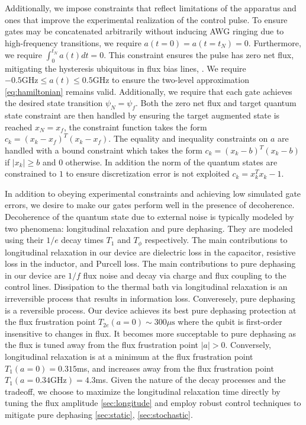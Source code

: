 Additionally, we impose constraints that reflect limitations
of the apparatus and ones that improve the experimental realization
of the control pulse. To ensure gates may be concatenated arbitrarily without
inducing AWG ringing due to high-frequency transitions,
we require $a(t = 0) = a(t = t_{N}) = 0$.
Furthermore, we require $\int_{0}^{t_{N}} a(t) dt = 0$. This
constraint ensures the pulse has zero net flux, mitigating
the hysteresis ubiquitous in flux bias lines,
\cite{battistel2019fast, krantz2019quantum, zhang2020universal}.
We require $-0.5 \textrm{GHz} \le a(t) \le 0.5 \textrm{GHz}$
to ensure the two-level approximation \eqref{eq:hamiltonian}
remains valid. Additionally, we require that each gate achieves
the desired state transition $\psi_{N} = \psi_{f}$.
Both the zero net flux and target quantum state constraint
are then handled by ensuring the target augmented state is
reached $x_{N} = x_{f}$, the constraint function
takes the form
$c_{k} = (x_{k} - x_{f})^{T}(x_{k} - x_{f})$.
The equality and inequality constraints on $a$ are handled
with a bound constraint which takes the form
$c_{k} = (x_{k} - b)^{T}(x_{k} - b)$ if $\lvert x_{k} \rvert \ge b$
and $0$ otherwise.
In addition the norm of the quantum states
are constrained to $1$ to ensure discretization error is not
exploited $c_{k} = x_{k}^{T}x_{k} - 1$.

In addition to obeying experimental constraints
and achieving low simulated gate errors, we desire
to make our gates perform well in the presence of decoherence.
Decoherence of the quantum state due to external noise
is typically modeled by two phenomena: longitudinal relaxation and pure dephasing.
They are modeled using their $1/e$ decay times $T_{1}$ and $T_{\phi}$ respectively.
The main contributions to longitudinal relaxation in our
device are dielectric loss in the capacitor, resistive loss in the inductor,
and Purcell loss. The main contributions to pure dephasing in our
device are $1/f$ flux noise and decay via charge and flux coupling
to the control lines.
Dissipation to the thermal bath via longitudinal
relaxation is an irreversible process
that results in information loss.
Converesely, pure dephasing is a reversible process.
Our device achieves its best pure dephasing
protection at the flux frustration point
$T_{2e}(a = 0) \sim 300 \mu\textrm{s}$
where the qubit is first-order insensitive to changes in flux.
It becomes more succeptable to pure dephasing as the flux is tuned away from the flux
frustration point $|a| > 0$. Conversely, longitudinal relaxation is at a minimum
at the flux frustration point $T_{1}(a = 0) = 0.315$ms,
and increases away from the flux frustration point
$T_{1}(a = 0.34 \textrm{GHz}) = 4.3$ms. Given the nature
of the decay processes and the tradeoff, we choose
to maximize the longitudinal relaxation time directly
by tuning the flux amplitude \ref{sec:longitude} and employ robust control techniques to mitigate
pure dephasing \ref{sec:static}, \ref{sec:stochastic}.
